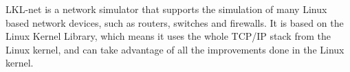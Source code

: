 
LKL-net is a network simulator that supports the simulation of
many Linux based network devices, such as routers, switches and
firewalls. It is based on the Linux Kernel Library, which means
it uses the whole TCP/IP stack from the Linux kernel, and can
take advantage of all the improvements done in the Linux kernel.
